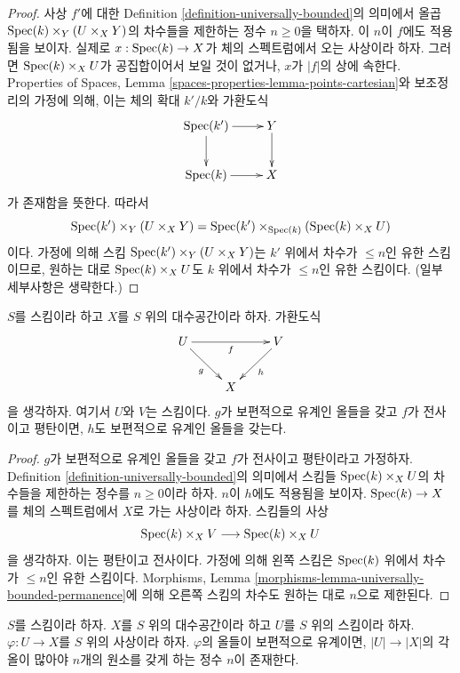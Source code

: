 \begin{proof}
사상 $f'$에 대한 Definition \ref{definition-universally-bounded}의 의미에서
올곱 $\mathop{\mathrm{Spec}}(k) \times_Y (U \times_X Y)$의 차수들을 제한하는 정수
$n \geq 0$을 택하자. 이 $n$이 $f$에도 적용됨을 보이자. 실제로
$x : \mathop{\mathrm{Spec}}(k) \to X$가 체의 스펙트럼에서 오는 사상이라 하자. 그러면
$\mathop{\mathrm{Spec}}(k) \times_X U$가 공집합이어서 보일 것이 없거나, $x$가 $|f|$의
상에 속한다. Properties of Spaces, Lemma
\ref{spaces-properties-lemma-points-cartesian}와 보조정리의 가정에 의해,
이는 체의 확대 $k'/k$와 가환도식
$$
\xymatrix{
\Spec(k') \ar[r] \ar[d] & Y \ar[d] \\
\Spec(k) \ar[r] & X
}
$$
가 존재함을 뜻한다. 따라서
$$
\mathop{\mathrm{Spec}}(k') \times_Y (U \times_X Y) =
\mathop{\mathrm{Spec}}(k') \times_{\mathop{\mathrm{Spec}}(k)} (\mathop{\mathrm{Spec}}(k) \times_X U)
$$
이다. 가정에 의해 스킴 $\mathop{\mathrm{Spec}}(k') \times_Y (U \times_X Y)$는 $k'$ 위에서
차수가 $\leq n$인 유한 스킴이므로, 원하는 대로 $\mathop{\mathrm{Spec}}(k) \times_X U$도
$k$ 위에서 차수가 $\leq n$인 유한 스킴이다. (일부 세부사항은 생략한다.)
\end{proof}

\begin{lemma}
\label{lemma-universally-bounded-permanence}
$S$를 스킴이라 하고 $X$를 $S$ 위의 대수공간이라 하자. 가환도식
$$
\xymatrix{
U \ar[rd]_g \ar[rr]_f & & V \ar[ld]^h \\
& X &
}
$$
을 생각하자. 여기서 $U$와 $V$는 스킴이다. $g$가 보편적으로 유계인 올들을
갖고 $f$가 전사이고 평탄이면, $h$도 보편적으로 유계인 올들을 갖는다.
\end{lemma}

\begin{proof}
$g$가 보편적으로 유계인 올들을 갖고 $f$가 전사이고 평탄이라고 가정하자.
Definition \ref{definition-universally-bounded}의 의미에서 스킴들
$\mathop{\mathrm{Spec}}(k) \times_X U$의 차수들을 제한하는 정수를 $n \geq 0$이라 하자.
$n$이 $h$에도 적용됨을 보이자. $\mathop{\mathrm{Spec}}(k) \to X$를 체의 스펙트럼에서
$X$로 가는 사상이라 하자. 스킴들의 사상
$$
\mathop{\mathrm{Spec}}(k) \times_X V \longrightarrow \mathop{\mathrm{Spec}}(k) \times_X U
$$
을 생각하자. 이는 평탄이고 전사이다. 가정에 의해 왼쪽 스킴은
$\mathop{\mathrm{Spec}}(k)$ 위에서 차수가 $\leq n$인 유한 스킴이다. Morphisms, Lemma
\ref{morphisms-lemma-universally-bounded-permanence}에 의해 오른쪽 스킴의
차수도 원하는 대로 $n$으로 제한된다.
\end{proof}

\begin{lemma}
\label{lemma-universally-bounded-finite-fibres}
$S$를 스킴이라 하자. $X$를 $S$ 위의 대수공간이라 하고 $U$를 $S$ 위의
스킴이라 하자. $\varphi : U \to X$를 $S$ 위의 사상이라 하자.
$\varphi$의 올들이 보편적으로 유계이면, $|U| \to |X|$의 각 올이 많아야
$n$개의 원소를 갖게 하는 정수 $n$이 존재한다.
\end{lemma}

